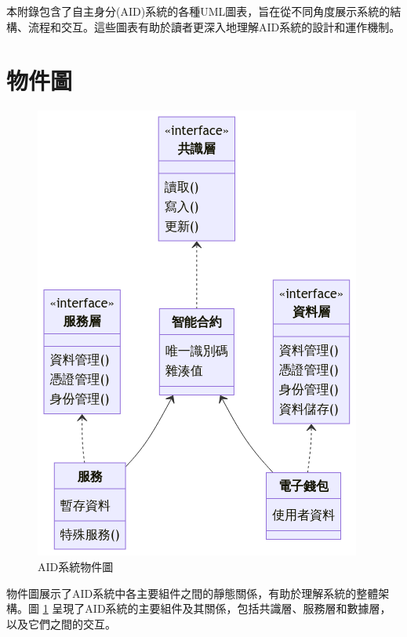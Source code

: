
本附錄包含了自主身分(AID)系統的各種UML圖表，旨在從不同角度展示系統的結構、流程和交互。這些圖表有助於讀者更深入地理解AID系統的設計和運作機制。
\section{物件圖}
\begin{figure}
  \centering
  \includegraphics[width=\linewidth]{figures/design-struct.png}
  \caption{AID系統物件圖}
  \label{fig:appendix-aid-struct}
\end{figure}
物件圖展示了AID系統中各主要組件之間的靜態關係，有助於理解系統的整體架構。圖 \ref{fig:appendix-aid-struct} 呈現了AID系統的主要組件及其關係，包括共識層、服務層和數據層，以及它們之間的交互。
